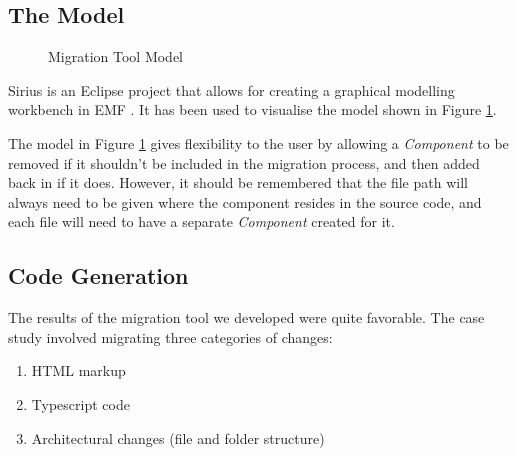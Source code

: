 \documentclass[conference]{IEEEtran}
\begin{document}
\subsection{The Model}
\begin{figure}[H]
\caption{Migration Tool Model}
\label{fig:model}
\end{figure}

Sirius is an Eclipse project that allows for creating a graphical modelling workbench in EMF \cite{b12}. It has been used to visualise the model shown in Figure \ref{fig:model}.

The model in Figure \ref{fig:model} gives flexibility to the user by allowing a \textit{Component} to be removed if it shouldn’t be included in the migration process, and then added back in if it does. However, it should be remembered that the file path will always need to be given where the component resides in the source code, and each file will need to have a separate \textit{Component} created for it.

\subsection{Code Generation}
The results of the migration tool we developed were quite favorable. The case study
involved migrating three categories of changes:
\begin{enumerate}
    \item HTML markup
    \item Typescript code
    \item Architectural changes (file and folder structure)
\end{enumerate}
\end{document}
